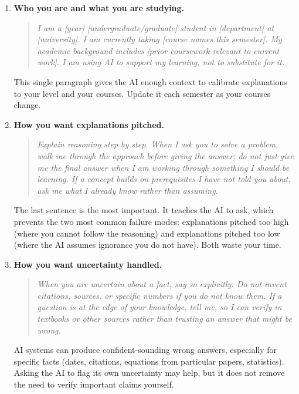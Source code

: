\documentclass{SIAMbook2023}
\begin{document}
\begin{enumerate}
\item \textbf{Who you are and what you are studying.}

\begin{quote}
\textit{I am a [year] [undergraduate/graduate] student in [department] at [university]. I am currently taking [course names this semester]. My academic background includes [prior coursework relevant to current work]. I am using AI to support my learning, not to substitute for it.}
\end{quote}

This single paragraph gives the AI enough context to calibrate explanations to your level and your courses. Update it each semester as your courses change.

\item \textbf{How you want explanations pitched.}

\begin{quote}
\textit{Explain reasoning step by step. When I ask you to solve a problem, walk me through the approach before giving the answer; do not just give me the final answer when I am working through something I should be learning. If a concept builds on prerequisites I have not told you about, ask me what I already know rather than assuming.}
\end{quote}

The last sentence is the most important. It teaches the AI to ask, which prevents the two most common failure modes: explanations pitched too high (where you cannot follow the reasoning) and explanations pitched too low (where the AI assumes ignorance you do not have). Both waste your time.

\item \textbf{How you want uncertainty handled.}

\begin{quote}
\textit{When you are uncertain about a fact, say so explicitly. Do not invent citations, sources, or specific numbers if you do not know them. If a question is at the edge of your knowledge, tell me, so I can verify in textbooks or other sources rather than trusting an answer that might be wrong.}
\end{quote}

AI systems can produce confident-sounding wrong answers, especially for specific facts (dates, citations, equations from particular papers, statistics). Asking the AI to flag its own uncertainty may help, but it does not remove the need to verify important claims yourself.


\end{enumerate}
\end{document}
